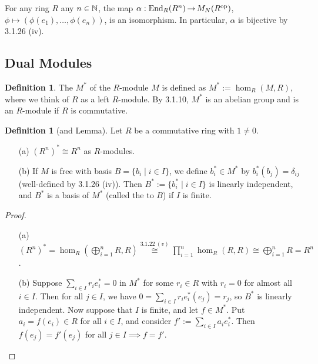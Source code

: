 \documentclass[11pt]{book}
\theoremstyle{definition}   \newtheorem{defn}[counter]{Definition} %
\DeclareMathOperator{\ra}{\rightarrow}   \DeclareMathOperator{\Poly}{\mathbf{P}}   \DeclareMathOperator{\spn}{\textnormal{span}}   \DeclareMathOperator{\aut}{\textnormal{Aut}}
\newcommand{\vs}{\vspace{8pt}}
\numberwithin{counter}{chapter}
\begin{document}
\begin{example}
For any ring $R$ any $n \in \operatorname{\mathbb{N}}$, the map $\alpha : \tn{End}_R(R^n) \ra M_N(R\op)$, $\phi \mapsto (\phi(e_1),\dots,\phi(e_n))$, is an isomorphism. In particular, $\alpha$ is bijective by 3.1.26 (iv).
\end{example}

\vs

\subsection*{Dual Modules}

\vs

\begin{defn}
The  $M^*$ of the $R$-module $M$ is defined as $M^* := \hom_R(M,R)$, where we think of $R$ as a left $R$-module. By 3.1.10, $M^*$ is an abelian group and is an $R$-module if $R$ is commutative.
\end{defn}

\vs

\begin{defn}[and Lemma]
Let $R$ be a commutative ring with $1 \ne 0$.
\begin{enumerate}
\item[(a)] $(R^n)^* \cong R^n$ as $R$-modules.
\item[(b)] If $M$ is free with basis $B = \{b_i \mid i \in I\}$, we define $b_i^* \in M^*$ by $b_i^*(b_j) = \delta_{ij}$ (well-defined by 3.1.26 (iv)). Then $B^* := \{b_i^* \mid i \in I\}$ is linearly independent, and $B^*$ is a basis of $M^*$ (called the  to $B$) if $I$ is finite.
\end{enumerate}
\end{defn}

\begin{proof}
\begin{enumerate}\
\item[(a)] $(R^n)^* = \hom_R\left(\bigoplus_{i=1}^n R, R\right) \overset{3.1.22 \ (v)}{\cong} \prod_{i=1}^n \hom_R(R,R) \cong \bigoplus_{i=1}^n R = R^n$.

\item[(b)] Suppose $\sum_{i \in I} r_i e_{i}^* = 0$ in $M^*$ for some $r_i \in R$ with $r_i = 0$ for almost all $i \in I$. Then for all $j \in I$, we have $0 = \sum_{i \in I} r_i e_i^*(e_j) = r_j$, so $B^*$ is linearly independent. Now suppose that $I$ is finite, and let $f \in M^*$. Put $a_i = f(e_i) \in R$ for all $i \in I$, and consider $f':= \sum_{i \in I} a_i e_i^*$. Then $f(e_j) = f'(e_j)$ for all $j \in I \implies f = f'$.
\end{enumerate}
\end{proof}
\end{document}
